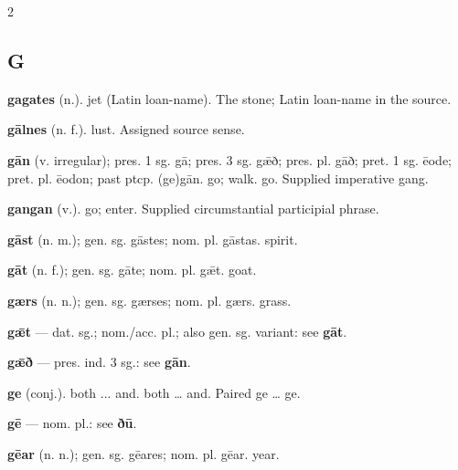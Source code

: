 \begin{multicols*}{2}
\subsection*{G}
\textbf{gagates} (n.). jet (Latin loan-name). The stone; Latin loan-name in the source.\par
\textbf{gālnes} (n. f.). lust. Assigned source sense.\par
\textbf{gān} (v. irregular); pres. 1 sg. gā; pres. 3 sg. gǣð; pres. pl. gāð; pret. 1 sg. ēode; pret. pl. ēodon; past ptcp. (ge)gān. go; walk. go. Supplied imperative gang.\par
\textbf{gangan} (v.). go; enter. Supplied circumstantial participial phrase.\par
\textbf{gāst} (n. m.); gen. sg. gāstes; nom. pl. gāstas. spirit.\par
\textbf{gāt} (n. f.); gen. sg. gāte; nom. pl. gǣt. goat.\par
\textbf{gærs} (n. n.); gen. sg. gærses; nom. pl. gærs. grass.\par
\textbf{gǣt} — dat. sg.; nom./acc. pl.; also gen. sg. variant: see \textbf{gāt}.\par
\textbf{gǣð} — pres. ind. 3 sg.: see \textbf{gān}.\par
\textbf{ge} (conj.). both ... and. both … and. Paired ge … ge.\par
\textbf{gē} — nom. pl.: see \textbf{ðū}.\par
\textbf{gēar} (n. n.); gen. sg. gēares; nom. pl. gēar. year.\par

\end{multicols*}
